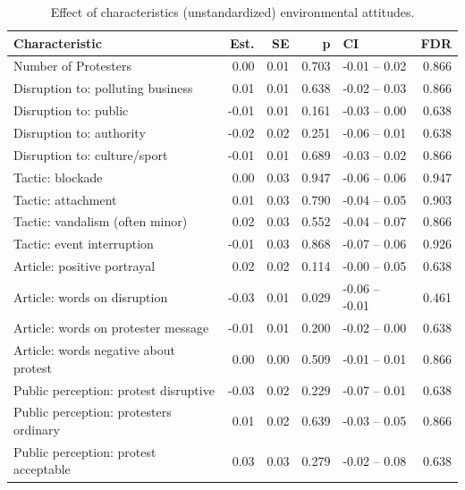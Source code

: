 \begin{table}[h!t]
\centering
\begin{tabular}{lrrrlr}
  \hline
Characteristic & Est. & SE & p & CI & FDR \\ 
  \hline
Number of Protesters & 0.00 & 0.01 & 0.703 & -0.01 -- 0.02 & 0.866 \\ 
  Disruption to: polluting business & 0.01 & 0.01 & 0.638 & -0.02 -- 0.03 & 0.866 \\ 
  Disruption to: public & -0.01 & 0.01 & 0.161 & -0.03 -- 0.00 & 0.638 \\ 
  Disruption to: authority & -0.02 & 0.02 & 0.251 & -0.06 -- 0.01 & 0.638 \\ 
  Disruption to: culture/sport & -0.01 & 0.01 & 0.689 & -0.03 -- 0.02 & 0.866 \\ 
  Tactic: blockade & 0.00 & 0.03 & 0.947 & -0.06 -- 0.06 & 0.947 \\ 
  Tactic: attachment & 0.01 & 0.03 & 0.790 & -0.04 -- 0.05 & 0.903 \\ 
  Tactic: vandalism (often minor) & 0.02 & 0.03 & 0.552 & -0.04 -- 0.07 & 0.866 \\ 
  Tactic: event interruption & -0.01 & 0.03 & 0.868 & -0.07 -- 0.06 & 0.926 \\ 
  Article: positive portrayal & 0.02 & 0.02 & 0.114 & -0.00 -- 0.05 & 0.638 \\ 
  Article: words on disruption & -0.03 & 0.01 & 0.029 & -0.06 -- -0.01 & 0.461 \\ 
  Article: words on protester message & -0.01 & 0.01 & 0.200 & -0.02 -- 0.00 & 0.638 \\ 
  Article: words negative about protest & 0.00 & 0.00 & 0.509 & -0.01 -- 0.01 & 0.866 \\ 
  Public perception: protest disruptive & -0.03 & 0.02 & 0.229 & -0.07 -- 0.01 & 0.638 \\ 
  Public perception: protesters ordinary & 0.01 & 0.02 & 0.639 & -0.03 -- 0.05 & 0.866 \\ 
  Public perception: protest acceptable & 0.03 & 0.03 & 0.279 & -0.02 -- 0.08 & 0.638 \\ 
   \hline
\end{tabular}
\caption{Effect of characteristics (unstandardized) environmental attitudes.} 
\label{tab:char_unstand}
\end{table}
